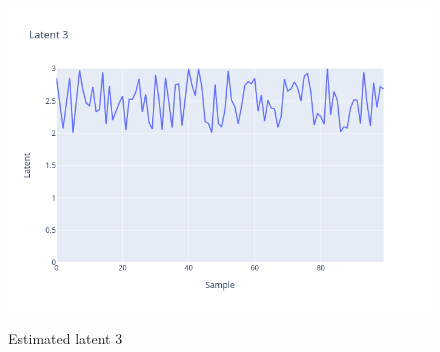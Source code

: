 \documentclass[12 pt]{article}  %
\begin{document}
\begin{figure}
    \begin{center}
        \href{../figures/latent3.html}{\includegraphics[width=7in]{../figures/latent3.png}}
        \caption{Estimated latent 3}
        \label{fig:latent3}
    \end{center}
\end{figure}
\end{document}
